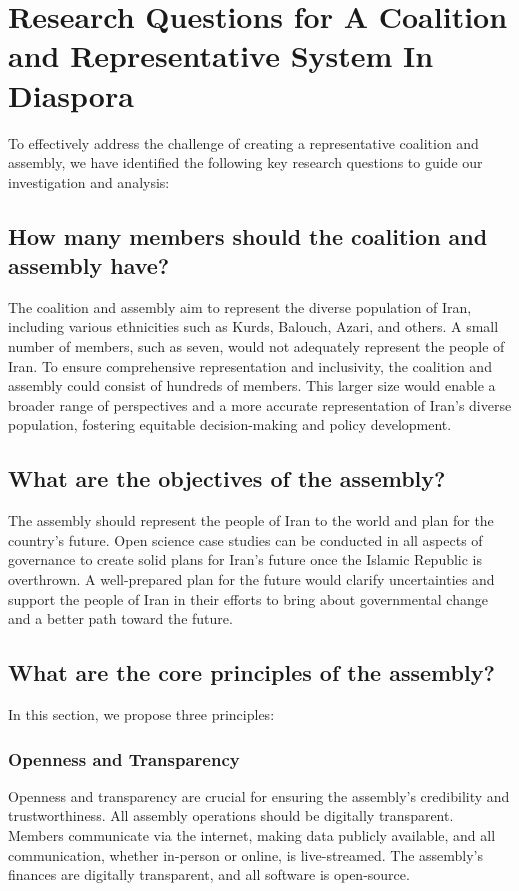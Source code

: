 \documentclass{IEEEtran}
\begin{document}
\section{Research Questions for A Coalition and Representative System In Diaspora}

To effectively address the challenge of creating a representative coalition and assembly, we have identified the following key research questions to guide our investigation and analysis:

\subsection{How many members should the coalition and assembly have?}
The coalition and assembly aim to represent the diverse population of Iran, including various ethnicities such as Kurds, Balouch, Azari, and others. A small number of members, such as seven, would not adequately represent the people of Iran. To ensure comprehensive representation and inclusivity, the coalition and assembly could consist of hundreds of members. This larger size would enable a broader range of perspectives and a more accurate representation of Iran's diverse population, fostering equitable decision-making and policy development.

\subsection{What are the objectives of the assembly?}
The assembly should represent the people of Iran to the world and plan for the country's future. Open science case studies can be conducted in all aspects of governance to create solid plans for Iran's future once the Islamic Republic is overthrown. A well-prepared plan for the future would clarify uncertainties and support the people of Iran in their efforts to bring about governmental change and a better path toward the future.

\subsection{What are the core principles of the assembly?}
In this section, we propose three principles:

\subsubsection{Openness and Transparency}
Openness and transparency are crucial for ensuring the assembly's credibility and trustworthiness. All assembly operations should be digitally transparent. Members communicate via the internet, making data publicly available, and all communication, whether in-person or online, is live-streamed. The assembly's finances are digitally transparent, and all software is open-source.
\end{document}
